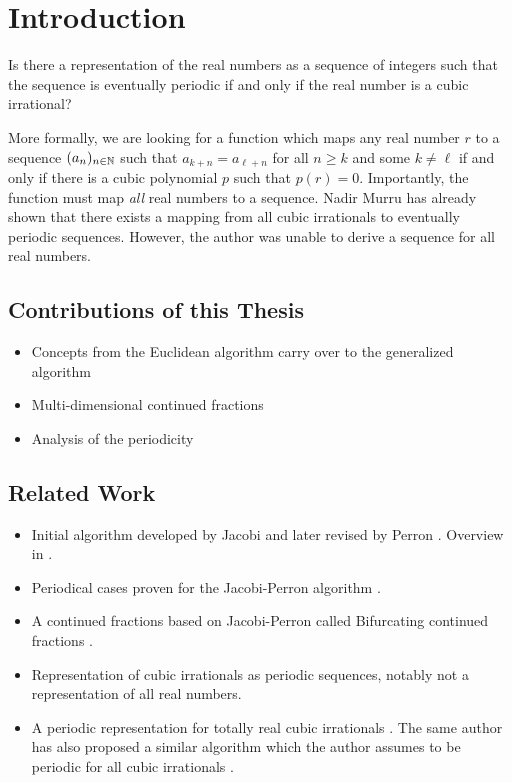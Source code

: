 \chapter{Introduction}
\label{ch:intro}

\begin{problem}
  Is there a representation of the real numbers as a sequence of integers such
  that the sequence is eventually periodic if and only if the real number is a
  cubic irrational?
\end{problem}

More formally, we are looking for a function which maps any real number $r$ to
a sequence $(a_n)_{n \in {\mathbb N}}$ such that $a_{k+n} = a_{\ell+n}$ for all $n \ge k$ and
some $k \ne \ell$ if and only if there is a cubic polynomial $p$ such that $p(r) = 0$.
Importantly, the function must map \emph{all} real numbers to a sequence.
Nadir Murru \cite{Murru15} has already shown that there exists a mapping from all
cubic irrationals to eventually periodic sequences.
However, the author was unable to derive a sequence for all real numbers.

\section{Contributions of this Thesis}

\begin{itemize}
  \item Concepts from the Euclidean algorithm carry over to the generalized algorithm
  \item Multi-dimensional continued fractions
  \item Analysis of the periodicity
\end{itemize}

\section{Related Work}

\begin{itemize}
  \item Initial algorithm developed by Jacobi \cite{Jacobi68} and later revised
    by Perron \cite{Perron07}. Overview in \cite{Bernstein71}.
  \item
    Periodical cases proven for the Jacobi-Perron algorithm \cite{Bernstein64}.
  \item
    A continued fractions based on Jacobi-Perron called Bifurcating continued
    fractions \cite{Gupta00}.
  \item
    Representation of cubic irrationals as periodic sequences, notably not a representation of all real numbers. \cite{Murru15}
  \item
    A periodic representation for totally real cubic irrationals \cite{Karpenkov24}.
    The same author has also proposed a similar algorithm which the author
    assumes to be periodic for all cubic irrationals \cite{Karpenkov21}.
\end{itemize}

